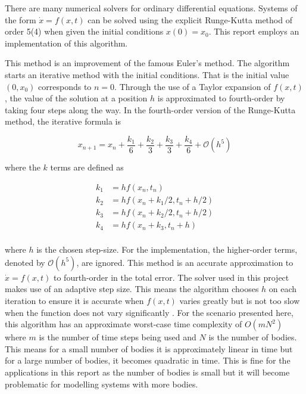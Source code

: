 \documentclass{physics_article_B}
\begin{document}
There are many numerical solvers for ordinary differential equations. Systems of the form $\dot{x} = f(x, t)$ can be solved using the explicit Runge-Kutta method of order 5(4) \cite{dormand_family_1980} when given the initial conditions $x(0) = x_0$. This report employs an implementation of this algorithm.

This method is an improvement of the famous Euler's method. The algorithm starts an iterative method with the initial conditions. That is the initial value $(0, x_0)$ corresponds to $n=0$. Through the use of a Taylor expansion of $f(x, t)$, the value of the solution at a position $h$ is approximated to fourth-order by taking four steps along the way. In the fourth-order version of the Runge-Kutta method, the iterative formula is \cite{press_numerical_1992}

\begin{equation}
 x_{n+1} = x_n + \frac{k_1}{6} + \frac{k_2}{3} + \frac{k_3}{3} + \frac{k_4}{6} + \mathcal{O}(h^5)
 \label{eq:rungekutta54}
\end{equation}

where the $k$ terms are defined as

\begin{equation}
 \begin{aligned}
 k_1 &= hf(x_n, t_n) \\
 k_2 &= hf(x_n + k_1/2, t_n + h/2) \\
 k_3 &= hf(x_n + k_2/2, t_n + h/2) \\
 k_4 &= hf(x_n + k_3, t_n + h) \\
 \end{aligned}
\end{equation}

where $h$ is the chosen step-size. For the implementation, the higher-order terms, denoted by $\mathcal{O}(h^5)$, are ignored. This method is an accurate approximation to $\dot{x} = f(x, t)$ to fourth-order in the total error. The solver used in this project makes use of an adaptive step size. This means the algorithm chooses $h$ on each iteration to ensure it is accurate when $f(x, t)$ varies greatly but is not too slow when the function does not vary significantly \cite{press_numerical_1992}. For the scenario presented here, this algorithm has an approximate worst-case time complexity of $O(mN^2)$ where $m$ is the number of time steps being used and $N$ is the number of bodies. This means for a small number of bodies it is approximately linear in time but for a large number of bodies, it becomes quadratic in time. This is fine for the applications in this report as the number of bodies is small but it will become problematic for modelling systems with more bodies.
\end{document}
